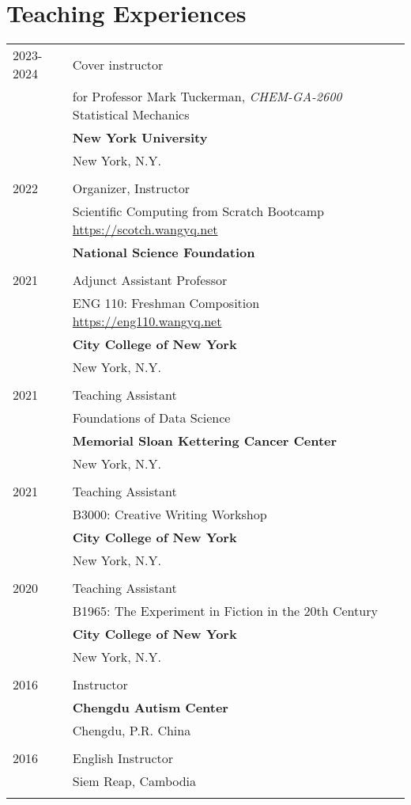\section{Teaching Experiences}
\begin{longtable}{p{} p{} }
\textsc{2023-2024} & Cover instructor \\
 & for Professor Mark Tuckerman, \textit{CHEM-GA-2600} Statistical Mechanics \\
 & \textbf{New York University} \\
 & New York, N.Y.\\\\

\textsc{2022} & Organizer, Instructor \\
 & Scientific Computing from Scratch Bootcamp \url{https://scotch.wangyq.net} \\
 & \textbf{National Science Foundation}\\\\

\textsc{2021} & Adjunct Assistant Professor \\
 & ENG 110: Freshman Composition \url{https://eng110.wangyq.net} \\
 & \textbf{City College of New York}\\
 & New York, N.Y.\\\\
 
 \textsc{2021} & Teaching Assistant \\
 & Foundations of Data Science \\
 & \textbf{Memorial Sloan Kettering Cancer Center} \\
 & New York, N.Y.\\\\
 
  \textsc{2021} & Teaching Assistant \\
 & B3000: Creative Writing Workshop \\
 & \textbf{City College of New York}\\
 & New York, N.Y.\\\\
 
 \textsc{2020} & Teaching Assistant \\
 & B1965: The Experiment in Fiction in the 20th Century\\
 & \textbf{City College of New York}\\
 & New York, N.Y.\\\\
 
 \textsc{2016} & Instructor\\
 & \textbf{Chengdu Autism Center} \\
 & Chengdu, P.R. China\\\\
 
  \textsc{2016} & English Instructor \\
 & Siem Reap, Cambodia\\\\
 \end{longtable}

